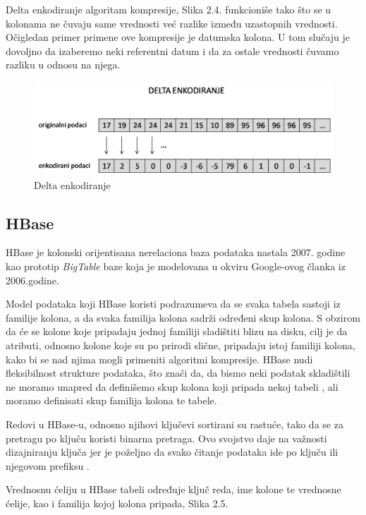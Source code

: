 \documentclass[12pt,oneside]{memoir}
\begin{document}
Delta enkodiranje algoritam kompresije, Slika 2.4. funkcioniše tako što se u kolonama ne čuvaju same vrednosti već razlike između uzastopnih vrednosti. Očigledan primer primene ove kompresije je datumska kolona. U tom slučaju  je dovoljno da izaberemo neki referentni datum i da za ostale vrednosti čuvamo razliku u odnosu na njega.

\begin{figure}[!ht]
  \centering
  \includegraphics[width=1\textwidth]{delta-encoding.png}
  \caption{Delta enkodiranje}
  \label{fig:grafikon}
\end{figure}

\subsection{HBase}

HBase je kolonski orijentisana nerelaciona baza podataka nastala 2007. godine kao prototip \textit{BigTable} baze koja je modelovana u okviru Google-ovog članka iz 2006.godine\cite{BigTable}. 

Model podataka koji HBase koristi podrazumeva da se svaka tabela sastoji iz familije kolona, a da svaka familija kolona sadrži određeni skup kolona.  S obzirom da će se kolone koje pripadaju jednoj familiji sladištiti blizu na disku, cilj je da atributi, odnosno kolone koje su po prirodi slične, pripadaju istoj familiji kolona, kako bi se nad njima mogli primeniti algoritmi kompresije. HBase nudi fleksibilnost strukture podataka, što znači da, da bismo neki podatak skladištili ne moramo unapred da definišemo skup kolona koji pripada nekoj tabeli , ali moramo definisati skup familija kolona te tabele.

Redovi u HBase-u, odnosno njihovi ključevi sortirani su rastuće, tako da se za pretragu po ključu koristi binarna pretraga. Ovo svojstvo daje na važnosti dizajniranju ključa jer je poželjno da svako čitanje podataka ide po ključu ili njegovom prefiksu \cite{hbaseSchema}. 

Vrednosnu ćeliju u HBase tabeli određuje ključ reda, ime kolone te vrednosne ćelije, kao i familija kojoj kolona pripada, Slika 2.5.
\end{document}
